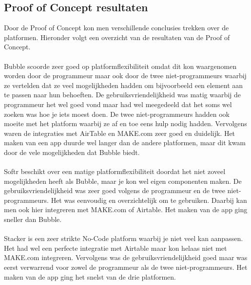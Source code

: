 \subsection{Proof of Concept resultaten}%
\label{subsec:proof-of-concept-resultaten}
Door de Proof of Concept kon men verschillende conclusies trekken over de platformen. Hieronder volgt een overzicht van de resultaten van de Proof of Concept.
\\
\\
Bubble scoorde zeer goed op platformflexibiliteit omdat dit kon waargenomen worden door de programmeur maar ook door de twee niet-programmeurs waarbij ze vertelden dat ze veel mogelijkheden hadden om bijvoorbeeld een element aan te passen 
naar hun behoeften. De gebruiksvriendelijkheid was matig waarbij de programmeur het wel goed vond maar had wel meegedeeld dat het soms wel zoeken was hoe je iets moest doen. De twee niet-programmeurs hadden ook moeite met het platform waarbij ze af en toe eens hulp nodig hadden. Vervolgens 
waren de integraties met AirTable en MAKE.com zeer goed en duidelijk. Het maken van een app duurde wel langer dan de andere platformen, maar dit kwam door de vele mogelijkheden dat Bubble biedt.
\\
\\
Softr beschikt over een matige platformflexibiliteit doordat het niet zoveel mogelijkheden heeft als Bubble, maar je kon wel eigen componenten maken. De gebruiksvriendelijkheid was zeer goed volgens de programmeur en de twee niet-programmeurs. Het was eenvoudig en overzichtelijk om te gebruiken.
Daarbij kan men ook hier integreren met MAKE.com of Airtable. Het maken van de app ging sneller dan Bubble.
\\
\\
Stacker is een zeer strikte No-Code platform waarbij je niet veel kan aanpassen. Het had wel een perfecte integratie met Airtable maar kon helaas niet met MAKE.com integreren.
Vervolgens was de gebruiksvriendelijkheid goed maar was eerst verwarrend voor zowel de programmeur als de twee niet-programmeurs. Het maken van de app ging het snelst van de drie platformen.

